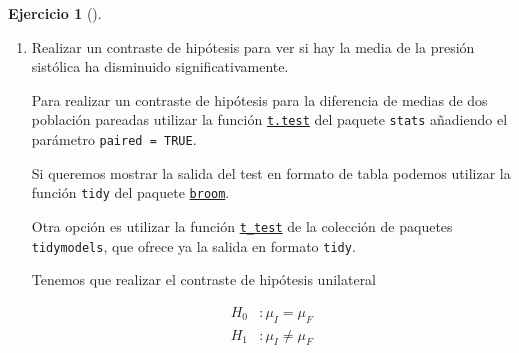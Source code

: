 \documentclass[
  a4paper,
]{scrreport}
\theoremstyle{definition}
\newtheorem{exercise}{Ejercicio}[chapter]
\theoremstyle{remark}
\begin{document}
\begin{exercise}[]
\begin{enumerate}
\begin{tcolorbox}
  \end{tcolorbox}
\item
  Realizar un contraste de hipótesis para ver si hay la media de la
  presión sistólica ha disminuido significativamente.

  \begin{tcolorbox}[enhanced jigsaw, colframe=quarto-callout-note-color-frame, toprule=.15mm, bottomtitle=1mm, breakable, opacitybacktitle=0.6, toptitle=1mm, colback=white, bottomrule=.15mm, title=\textcolor{quarto-callout-note-color}{\faInfo}\hspace{0.5em}{Ayuda}, arc=.35mm, left=2mm, titlerule=0mm, rightrule=.15mm, coltitle=black, leftrule=.75mm, opacityback=0, colbacktitle=quarto-callout-note-color!10!white]

  Para realizar un contraste de hipótesis para la diferencia de medias
  de dos población pareadas utilizar la función
  \href{https://www.rdocumentation.org/packages/stats/versions/3.6.2/topics/t.test}{\texttt{t.test}}
  del paquete \texttt{stats} añadiendo el parámetro
  \texttt{paired\ =\ TRUE}.

  Si queremos mostrar la salida del test en formato de tabla podemos
  utilizar la función \texttt{tidy} del paquete
  \href{https://broom.tidymodels.org/index.html}{\texttt{broom}}.

  Otra opción es utilizar la función
  \href{https://infer.tidymodels.org/reference/t_test.html}{\texttt{t\_test}}
  de la colección de paquetes \texttt{tidymodels}, que ofrece ya la
  salida en formato \texttt{tidy}.

  \end{tcolorbox}

  \begin{tcolorbox}[enhanced jigsaw, colframe=quarto-callout-tip-color-frame, toprule=.15mm, bottomtitle=1mm, breakable, opacitybacktitle=0.6, toptitle=1mm, colback=white, bottomrule=.15mm, title=\textcolor{quarto-callout-tip-color}{\faLightbulb}\hspace{0.5em}{Solución}, arc=.35mm, left=2mm, titlerule=0mm, rightrule=.15mm, coltitle=black, leftrule=.75mm, opacityback=0, colbacktitle=quarto-callout-tip-color!10!white]

  Tenemos que realizar el contraste de hipótesis unilateral

  \begin{align*}
  H_0 &: \mu_I = \mu_F \\
  H_1 &: \mu_I \neq \mu_F 
  \end{align*}


\end{tcolorbox}
\end{enumerate}
\end{exercise}
\end{document}
